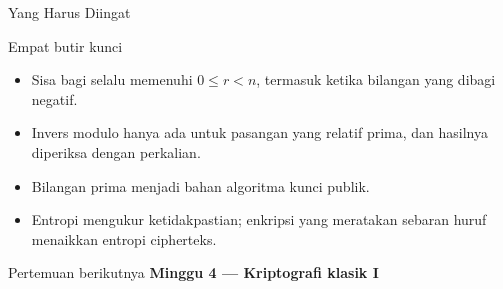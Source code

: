 \documentclass[aspectratio=169,11pt]{beamer}
\begin{document}
\begin{frame}{Yang Harus Diingat}
    \begin{block}{Empat butir kunci}
        \begin{itemize}
            \item Sisa bagi selalu memenuhi $0 \le r < n$, termasuk ketika
                  bilangan yang dibagi negatif.
            \item Invers modulo hanya ada untuk pasangan yang relatif prima,
                  dan hasilnya diperiksa dengan perkalian.
            \item Bilangan prima menjadi bahan algoritma kunci publik.
            \item Entropi mengukur ketidakpastian; enkripsi yang meratakan
                  sebaran huruf menaikkan entropi cipherteks.
        \end{itemize}
    \end{block}
    \vspace{0.3cm}
    \begin{exampleblock}{Pertemuan berikutnya}
        \textbf{Minggu 4 --- Kriptografi klasik I}
    \end{exampleblock}
\end{frame}
\end{document}
